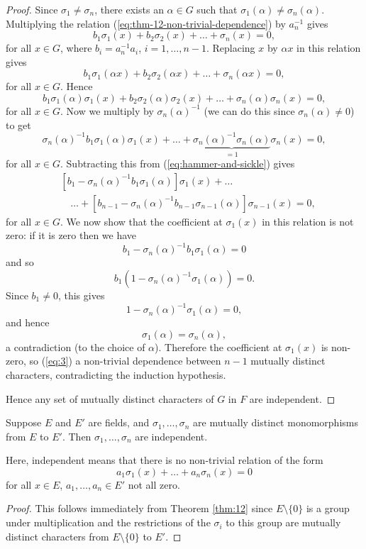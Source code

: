 \begin{theorem}
\begin{proof}
		Since $\sigma_1 \neq \sigma_n$, there exists an $\alpha \in G$ such that $\sigma_1(\alpha) \neq \sigma_n(\alpha)$. Multiplying the relation (\ref{eq:thm-12-non-trivial-dependence}) by $a_n^{-1}$ gives
		\begin{equation}\label{eq:hammer-and-sickle}
			b_1 \sigma_1(x) + b_2 \sigma_2(x) + \dots + \sigma_n(x) = 0,
		\end{equation}
		for all $x \in G$, where $b_i = a_n^{-1} a_i$, $i = 1, \dots, n - 1$. Replacing $x$ by $\alpha x$ in this relation gives
		\[
			b_1 \sigma_1(\alpha x) + b_2 \sigma_2(\alpha x) + \dots + \sigma_n(\alpha x) = 0,
		\]
		for all $x \in G$. Hence
		\[
			b_1 \sigma_1(\alpha) \sigma_1(x) + b_2 \sigma_2(\alpha) \sigma_2(x) + \dots + \sigma_n(\alpha) \sigma_n(x) = 0,
		\]
		for all $x \in G$. Now we multiply by $\sigma_n(\alpha)^{-1}$ (we can do this since $\sigma_n(\alpha) \neq 0$) to get
		\[
			\sigma_n(\alpha)^{-1} b_1 \sigma_1(\alpha) \sigma_1(x) + \dots + \underbrace{\sigma_n(\alpha)^{-1} \sigma_n(\alpha)}_{= 1} \sigma_n(x) = 0,
		\]
		for all $x \in G$. Subtracting this from (\ref{eq:hammer-and-sickle}) gives
		\begin{align}
			&[b_1 - \sigma_n(\alpha)^{-1} b_1 \sigma_1(\alpha)] \sigma_1(x) + \dots \nonumber \\
			& \quad \dots + [b_{n - 1} - \sigma_n(\alpha)^{-1} b_{n - 1} \sigma_{n - 1}(\alpha)] \sigma_{n - 1}(x) = 0, \label{eq:3}
		\end{align}
		for all $x \in G$. We now show that the coefficient at $\sigma_1(x)$ in this relation is not zero: if it is zero then we have
		\[
			b_1 - \sigma_n(\alpha)^{-1} b_1 \sigma_1(\alpha) = 0
		\]
		and so
		\[
			b_1 (1 - \sigma_n(\alpha)^{-1} \sigma_1(\alpha)) = 0.
		\]
		Since $b_1 \neq 0$, this gives
		\[
			1 - \sigma_n(\alpha)^{-1} \sigma_1(\alpha) = 0,
		\]
		and hence
		\[
			\sigma_1(\alpha) = \sigma_n(\alpha),
		\]
		a contradiction (to the choice of $\alpha$). Therefore the coefficient at $\sigma_1(x)$ is non-zero, so (\ref{eq:3}) a non-trivial dependence between $n - 1$ mutually distinct characters, contradicting the induction hypothesis.
		
		Hence any set of mutually distinct characters of $G$ in $F$ are independent.
	\end{proof}
\end{theorem}

\begin{corollary}\label{cor:to-thm-12}
	Suppose $E$ and $E'$ are fields, and $\sigma_1, \dots, \sigma_n$ are mutually distinct monomorphisms from $E$ to $E'$. Then $\sigma_1, \dots, \sigma_n$ are independent.
	
	Here, independent means that there is no non-trivial relation of the form
	\[
		a_1 \sigma_1(x) + \dots + a_n \sigma_n(x) = 0
	\]
	for all $x \in E$, $a_1, \dots, a_n \in E'$ not all zero.
	\begin{proof}
		This follows immediately from Theorem \ref{thm:12} since $E \setminus \{0\}$ is a group under multiplication and the restrictions of the $\sigma_i$ to this group are mutually distinct characters from $E \setminus \{0\}$ to $E'$.
	\end{proof}
\end{corollary}

